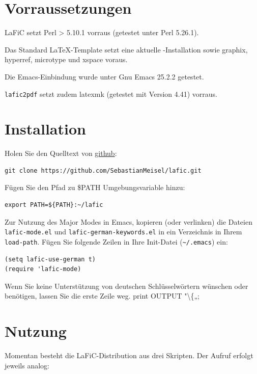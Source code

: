 \documentclass{scrartcl}
\begin{document}
\section{Vorraussetzungen}

LaFiC setzt Perl > 5.10.1 vorraus (getestet unter Perl 5.26.1).

Das Standard \LaTeX-Template setzt eine aktuelle
\XeLaTeX-Installation sowie graphix, hyperref, microtype und
xspace voraus.

Die Emacs-Einbindung wurde unter Gnu Emacs 25.2.2 getestet.

\texttt{lafic2pdf} setzt zudem latexmk (getestet mit Version 4.41) vorraus.

\section{Installation}
\label{Installation}

Holen Sie den Quelltext von \href{https://github.com}{github}:

\begin{verbatim}
git clone https://github.com/SebastianMeisel/lafic.git

\end{verbatim}

Fügen Sie den Pfad zu \$PATH Umgebungsvariable hinzu:

\begin{verbatim}
export PATH=${PATH}:~/lafic

\end{verbatim}

Zur Nutzung des Major Modes in Emacs, kopieren (oder
verlinken) die Dateien \texttt{lafic-mode.el} und
\texttt{lafic-german-keywords.el} in ein Verzeichnis in Ihrem
\texttt{load-path}. Fügen Sie folgende Zeilen in Ihre Init-Datei
(\texttt{\textasciitilde /.emacs}) ein:

\begin{verbatim}
(setq lafic-use-german t)
(require 'lafic-mode)

\end{verbatim}

Wenn Sie keine Unterstützung von deutschen Schlüsselwörtern
wünschen oder benötigen, lassen Sie die erste Zeile weg.
	print OUTPUT "\textbackslash \{„;

\section{Nutzung}

Momentan besteht die LaFiC-Distribution aus drei
Skripten. Der Aufruf erfolgt jeweils analog:
\end{document}
